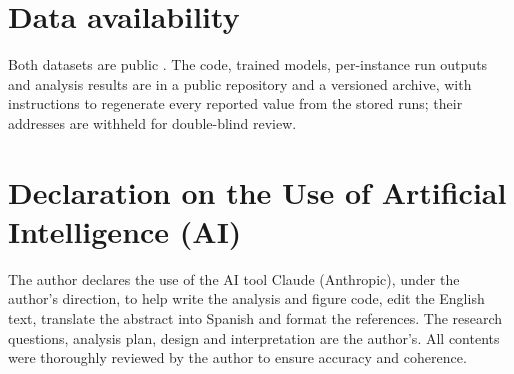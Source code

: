 \documentclass[12pt,letterpaper]{article}
\newcommand{\paperdrelease}{paper-d-submission-2026-10-03}
\newcommand{\paperdarchive}{\url{https://doi.org/10.5281/zenodo.23130014}}
\newif\iffull
\begin{document}
\section*{Data availability}
\iffull
Both datasets are public \cite{becker1996adult,hofmann1994statlog}. The code, trained
models, per-instance run outputs and analysis results are available at
\url{https://github.com/jonnabio/xai-eval-framework} (release \texttt{\paperdrelease}),
archived at \paperdarchive. Every reported value can be regenerated from the stored runs
by following \texttt{docs/reports/paper\_d/README.md}.
\else
Both datasets are public \cite{becker1996adult,hofmann1994statlog}. The code, trained
models, per-instance run outputs and analysis results are in a public repository and a
versioned archive, with instructions to regenerate every reported value from the stored
runs; their addresses are withheld for double-blind review.
\fi




\section*{Declaration on the Use of Artificial Intelligence (AI)}
The author declares the use of the AI tool Claude (Anthropic), under the author's
direction, to help write the analysis and figure code, edit the English text, translate the
abstract into Spanish and format the references. The research questions, analysis plan,
design and interpretation are the author's. All contents were thoroughly reviewed by the
author to ensure accuracy and coherence.
\end{document}
